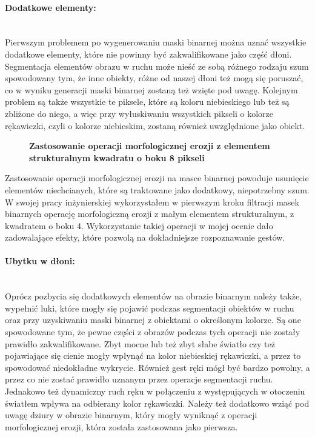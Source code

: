 \documentclass[a4paper,12pt,twoside,openany]{report}
\newcommand{\ImgPath}{.}
\begin{document}
\paragraph{Dodatkowe elementy:} \mbox{} \\
\indent
Pierwszym problemem po wygenerowaniu maski binarnej można uznać wszystkie dodatkowe elementy, które nie powinny być zakwalifikowane jako część dłoni. Segmentacja elementów obrazu w ruchu może nieść ze sobą różnego rodzaju szum spowodowany tym, że inne obiekty, różne od naszej dłoni też mogą się poruszać, co w wyniku generacji maski binarnej zostaną też wzięte pod uwagę. Kolejnym problem są także wszystkie te piksele, które są koloru niebieskiego lub też są zbliżone do niego, a więc przy wyłuskiwaniu wszystkich pikseli o kolorze rękawiczki, czyli o kolorze niebieskim, zostaną również uwzględnione jako obiekt.

\begin{figure}[H]
	\centering
	\caption{  \textbf{Zastosowanie operacji morfologicznej erozji z elementem strukturalnym kwadratu o boku 8 pikseli}}
\end{figure}

Zastosowanie operacji morfologicznej erozji na masce binarnej powoduje usunięcie elementów niechcianych, które są traktowane jako dodatkowy, niepotrzebny szum. W swojej pracy inżynierskiej wykorzystałem w pierwszym kroku filtracji masek binarnych operację morfologiczną erozji z małym elementem strukturalnym, z kwadratem o boku 4. Wykorzystanie takiej operacji w mojej ocenie dało zadowalające efekty, które pozwolą na dokładniejsze rozpoznawanie gestów.

\paragraph{Ubytku w dłoni:} \mbox{} \\ \indent
Oprócz pozbycia się dodatkowych elementów na obrazie binarnym należy także, wypełnić luki, które mogły się pojawić podczas segmentacji obiektów w ruchu oraz przy uzyskiwaniu maski binarnej z obiektami o określonym kolorze. Są one spowodowane tym, że pewne części z obrazów podczas tych operacji nie zostały prawidło zakwalifikowane. Zbyt mocne lub też zbyt słabe światło czy też pojawiające się cienie mogły wpłynąć na kolor niebieskiej rękawiczki, a przez to spowodować niedokładne wykrycie. Również gest ręki mógł być bardzo powolny, a przez co nie zostać prawidło uznanym  przez operacje segmentacji ruchu. Jednakowo też dynamiczny ruch ręku w połączeniu z występujących w otoczeniu światłem wpływa na odbierany kolor rękawiczki. Należy też dodatkowo wziąć pod uwagę dziury w obrazie binarnym, który mogły wyniknąć z operacji morfologicznej erozji, która została zastosowana jako pierwsza. 
\end{document}
